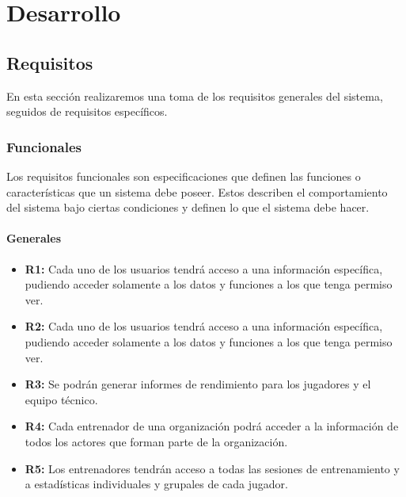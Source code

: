 
\chapter{Desarrollo}
\label{desarrollo}
\section{Requisitos}
En esta sección realizaremos una toma de los requisitos generales del sistema, seguidos de requisitos específicos.
\subsection{Funcionales}
Los requisitos funcionales son especificaciones que definen las funciones o características que un sistema debe poseer. Estos describen el comportamiento del sistema bajo ciertas condiciones y definen lo que el sistema debe hacer.

\subsubsection{Generales}
\begin{itemize}
    \item \textbf{R1:} Cada uno de los usuarios tendrá acceso a una información específica, pudiendo acceder solamente a los datos y funciones a los que tenga permiso ver.
    
    \item \textbf{R2:} Cada uno de los usuarios tendrá acceso a una información específica, pudiendo acceder solamente a los datos y funciones a los que tenga permiso ver.
    
    \item \textbf{R3:} Se podrán generar informes de rendimiento para los jugadores y el equipo técnico.
    
    \item \textbf{R4:} Cada entrenador de una organización podrá acceder a la información de todos los actores que forman parte de la organización.
    
    \item \textbf{R5:} Los entrenadores tendrán acceso a todas las sesiones de entrenamiento y a estadísticas individuales y grupales de cada jugador.    
\end{itemize}

